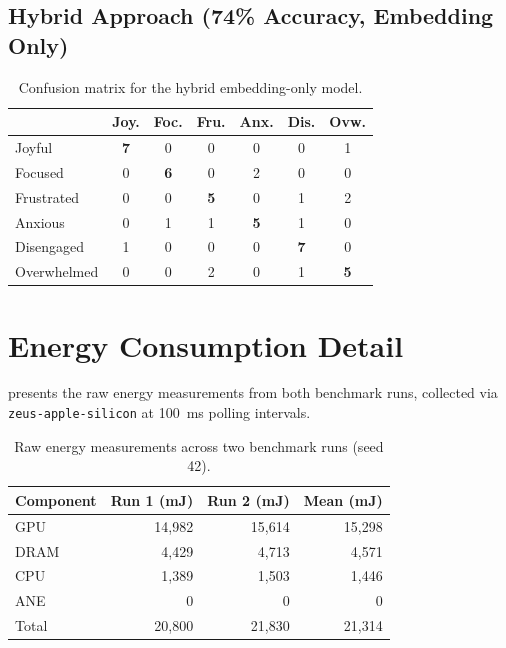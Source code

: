 \subsection{Hybrid Approach (74\% Accuracy, Embedding Only)}

\begin{table}[htbp]
  \centering
  \caption{Confusion matrix for the hybrid embedding-only model.}
  \label{tab:cm-hybrid}
  \begin{tabular}{@{}l cccccc@{}}
    \toprule
    & \textbf{Joy.} & \textbf{Foc.} & \textbf{Fru.} & \textbf{Anx.} & \textbf{Dis.} & \textbf{Ovw.} \\
    \midrule
    Joyful      & \textbf{7} & 0 & 0 & 0 & 0 & 1 \\
    Focused     & 0 & \textbf{6} & 0 & 2 & 0 & 0 \\
    Frustrated  & 0 & 0 & \textbf{5} & 0 & 1 & 2 \\
    Anxious     & 0 & 1 & 1 & \textbf{5} & 1 & 0 \\
    Disengaged  & 1 & 0 & 0 & 0 & \textbf{7} & 0 \\
    Overwhelmed & 0 & 0 & 2 & 0 & 1 & \textbf{5} \\
    \bottomrule
  \end{tabular}
\end{table}

\section{Energy Consumption Detail}

 presents the raw energy measurements from both benchmark runs, collected via \texttt{zeus-apple-silicon} at 100~ms polling intervals.

\begin{table}[htbp]
  \centering
  \caption{Raw energy measurements across two benchmark runs (seed 42).}
  \label{tab:energy-detail}
  \begin{tabular}{@{}lrrr@{}}
    \toprule
    \textbf{Component} & \textbf{Run 1 (mJ)} & \textbf{Run 2 (mJ)} & \textbf{Mean (mJ)} \\
    \midrule
    GPU   & 14,982 & 15,614 & 15,298 \\
    DRAM  &  4,429 &  4,713 &  4,571 \\
    CPU   &  1,389 &  1,503 &  1,446 \\
    ANE   &      0 &      0 &      0 \\
    \midrule
    Total & 20,800 & 21,830 & 21,314 \\
    \bottomrule
  \end{tabular}
\end{table}

